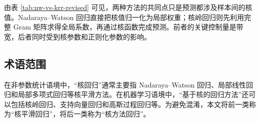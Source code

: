 \documentclass[UTF8,zihao=-4,openany]{ctexbook}
\begin{document}
由表 \ref{tab:nw-vs-krr-revised} 可见，两种方法的共同点只是预测都涉及样本间的核值。Nadaraya--Watson 回归直接把核值归一化为局部权重；核岭回归则先利用完整 Gram 矩阵求得全局系数，再通过核函数完成预测。前者的关键控制量是带宽，后者同时受到核参数和正则化参数的影响。

\subsection{术语范围}

在非参数统计语境中，“核回归”通常主要指 Nadaraya--Watson 回归、局部线性回归和局部多项式回归等核平滑方法。在机器学习语境中，“基于核的回归方法”还可以包括核岭回归、支持向量回归和高斯过程回归等。为避免混淆，本文将前一类称为“核平滑回归”，将后一类称为“核方法回归”。
\end{document}
